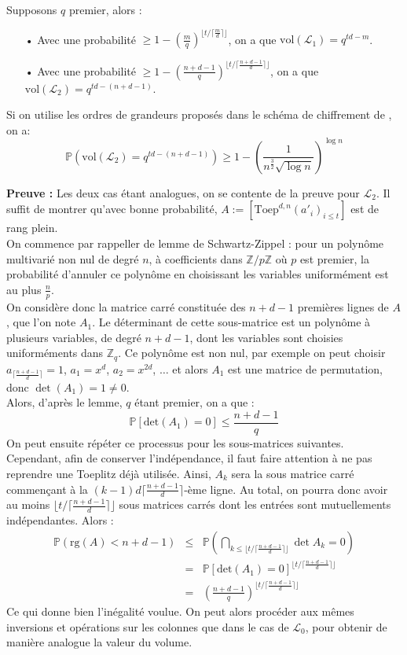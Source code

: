 \documentclass[11pt,a4paper]{article}
\begin{document}
\begin{theorem}
Supposons $q$ premier, alors : 
\begin{itemize}
\item[•] Avec une probabilité $\geq 1 - (\frac{m}{q})^{\lfloor t/\lceil\frac{m}{d}\rceil\rfloor}$, on a que $\text{vol}(\mathcal{L}_1)=q^{td-m}$.
\item[•] Avec une probabilité $\geq 1 - (\frac{n+d-1}{q})^{\lfloor t/\lceil\frac{n+d-1}{d}\rceil\rfloor}$, on a que $\text{vol}(\mathcal{L}_2)=q^{td-(n+d-1)}$. \\
\end{itemize}
Si on utilise les ordres de grandeurs proposés dans le schéma de chiffrement de \cite{mplwe}, on a:  \[\mathbb{P}(\text{vol}(\mathcal{L}_{2})=q^{td-(n+d-1)}) \geq 1 - (\frac{1}{n^\frac{3}{2}\sqrt{\log{n}}})^{\log{n}}\]
\end{theorem}
\textbf{Preuve :} Les deux cas étant analogues, on se contente de la preuve pour $\mathcal{L}_2$. Il suffit de montrer qu'avec bonne probabilité, $A:=[\text{Toep}^{d,n}(a'_i)_{i\leq t}]$ est de rang plein. \\
On commence par rappeller de lemme de Schwartz-Zippel : pour un polynôme multivarié non nul de degré $n$, à coefficients dans $\mathbb{Z}/p\mathbb{Z}$ où $p$ est premier, la probabilité d'annuler ce polynôme en choisissant les variables uniformément est au plus $\frac{n}{p}$. \\
On considère donc la matrice carré constituée des $n+d-1$ premières lignes de $A$, que l'on note $A_1$. Le déterminant de cette sous-matrice est un polynôme à plusieurs variables, de degré $n+d-1$, dont les variables sont choisies uniforméments dans $\mathbb{Z}_q$. Ce polynôme est non nul, par exemple on peut choisir $a_{\lceil\frac{n+d-1}{d}\rceil}=1$, $a_1= x^d$, $a_2=x^{2d}$, $\dots$ et alors $A_1$ est une matrice de permutation, donc $\det(A_1)= 1\neq 0$.
\\ Alors, d'après le lemme, $q$ étant premier, on a que : \[\mathbb{P}[\text{det}(A_1)=0] \leq \frac{n+d-1}{q}\]
On peut ensuite répéter ce processus pour les sous-matrices suivantes. Cependant, afin de conserver l'indépendance, il faut faire attention à ne pas reprendre une Toeplitz déjà utilisée. Ainsi, $A_k$ sera la sous matrice carré commençant à la $ (k-1)d\lceil \frac{n+d-1}{d} \rceil $-ème ligne. Au total, on pourra donc avoir au moins $\lfloor t/\lceil\frac{n+d-1}{d}\rceil\rfloor$ sous matrices carrés dont les entrées sont mutuellements indépendantes. Alors : 
\begin{eqnarray*}
\mathbb{P}(\text{rg}(A)<n+d-1) &\leq& \mathbb{P}(\bigcap_{k\leq\lfloor t/\lceil\frac{n+d-1}{d}\rceil\rfloor} \det{A_k} = 0) \\
&=&\mathbb{P}[\text{det}(A_1)=0]^{\lfloor t/\lceil\frac{n+d-1}{d}\rceil\rfloor} \\
&=&  (\frac{n+d-1}{q})^{\lfloor t/\lceil\frac{n+d-1}{d}\rceil\rfloor}
\end{eqnarray*}
Ce qui donne bien l'inégalité voulue.
On peut alors procéder aux mêmes inversions et opérations sur les colonnes que dans le cas de $\mathcal{L}_0$, pour obtenir de manière analogue la valeur du volume.
\end{document}
